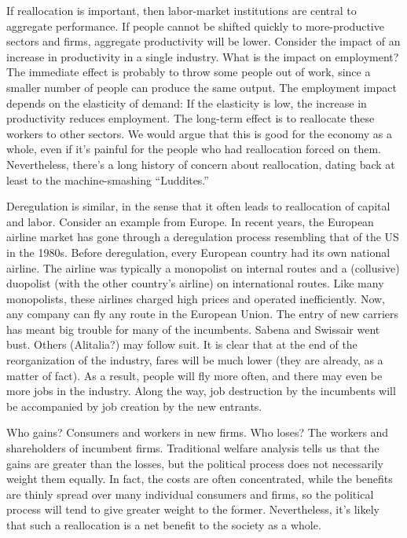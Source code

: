 If reallocation is important,
then labor-market institutions are central to aggregate performance.
If people cannot be shifted quickly to more-productive sectors
and firms, aggregate productivity will be lower.
Consider the impact of an increase in productivity in a single industry.
What is the impact on employment?
The immediate effect is probably to throw some people out of work, since
a smaller number of people can produce the same output.
The employment impact depends on the elasticity of demand:  If the elasticity is low,
the increase in productivity reduces employment.
The long-term effect is to reallocate these workers
to other sectors.
We would argue that this is good for the economy as a whole,
even if it's painful for the people who had reallocation forced on them.
Nevertheless, there's a long history of concern about reallocation,
dating back at least to the machine-smashing ``Luddites.''


Deregulation is similar, in the sense that it often leads to reallocation of capital and labor.
Consider an example from Europe. In recent years, the European
airline market has gone through a deregulation process resembling that of the US in the 1980s.
Before deregulation, every European country had its own national airline.
The airline was typically a monopolist on internal routes and a
(collusive) duopolist (with the other country's airline) on
international routes.  Like many monopolists, these airlines
charged high prices and operated inefficiently.  Now, any company
can fly any route in the European Union. The entry of new carriers
has meant big trouble
for many of the incumbents. Sabena and Swissair went bust. Others
(Alitalia?) may follow suit. It is clear that at the end
of the reorganization of the industry, fares will be much lower
(they are already, as a matter of fact).
As a result, people will fly more often,
 and there may even be more jobs in the industry.
 Along the way, job destruction by the incumbents will be
 accompanied by job creation by the new entrants.


Who gains? Consumers and workers in new firms. Who loses?
The workers and shareholders of incumbent firms.
Traditional welfare analysis tells us
that the gains are greater than the losses,
but the political process does not necessarily weight them
equally.  In fact, the costs are often concentrated, while the benefits are thinly spread over many individual consumers and firms,
so the political process will tend to give greater weight to the former.
Nevertheless, it's likely that such a reallocation
is a net benefit to the society as a whole.

